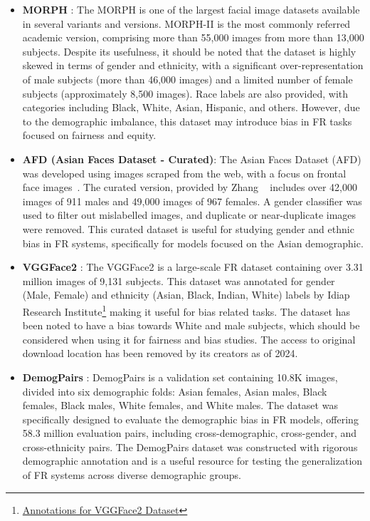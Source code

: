 \begin{itemize}

\item \textbf{MORPH} \cite{bingham2017morph}:
The MORPH is one of the largest facial image datasets available in several
variants and versions. MORPH-II is the most commonly referred
academic version, comprising more than 55,000 images from more
than 13,000 subjects. Despite its usefulness, it should be noted that the
dataset is highly skewed in terms of gender and ethnicity, with
a significant over-representation of male subjects (more than
46,000 images) and a limited number of female subjects
(approximately 8,500 images). Race labels are also provided,
with categories including Black, White, Asian, Hispanic, and
others. However, due to the demographic imbalance, this dataset
may introduce bias in FR tasks focused on fairness and equity.

\item \textbf{AFD (Asian Faces Dataset - Curated)}\cite{kai_curation_method}: 
The Asian Faces Dataset (AFD) was developed using images scraped from the web,
with a focus on frontal face images~\cite{xiong2018asian}. The curated version,
provided by Zhang \etal~\cite{kai_curation_method} includes over
42,000 images of 911 males and 49,000 images of
967 females. A gender classifier was used to filter out
mislabelled images, and duplicate or near-duplicate images were
removed. This curated dataset is useful for studying gender
and ethnic bias in FR systems, specifically for models focused
on the Asian demographic.  

\item \textbf{VGGFace2} \cite{cao2018vggface2}:
The VGGFace2 is a large-scale FR dataset containing over 3.31 million images of
9,131 subjects. This dataset was annotated for gender (Male,
Female) and ethnicity (Asian, Black, Indian, White) labels by
Idiap Research Institute\footnote{\href{https://gitlab.idiap.ch/bob/bob.bio.face/-
/blob/ master/src/bob/bio/face/database/vgg2.py}{Annotations for
VGGFace2 Dataset}} making it useful for bias related tasks. The
dataset has been noted to have a bias towards White and male
subjects, which should be considered when using it for fairness
and bias studies. The access to original download location has
been removed by its creators as of 2024.

        
\item \textbf{DemogPairs} \cite{hupont2019demogpairs}:
DemogPairs is a validation set containing 10.8K images, divided into six
demographic folds: Asian females, Asian males, Black females,
Black males, White females, and White males. The dataset was
specifically designed to evaluate the demographic bias in FR
models, offering 58.3 million evaluation pairs, including
cross-demographic, cross-gender, and cross-ethnicity pairs.
The DemogPairs dataset was constructed with rigorous demographic annotation
and is a useful resource for testing the generalization of FR
systems across diverse demographic groups.


\end{itemize}
